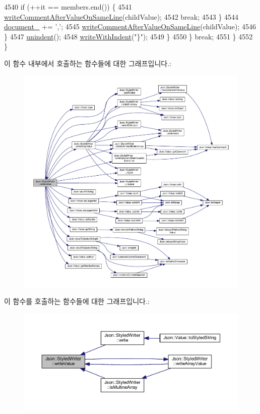 \begin{DoxyCode}
4540         \textcolor{keywordflow}{if} (++it == members.end()) \{
4541           \hyperlink{class_json_1_1_styled_writer_ab12b274c62822fc51ec4617c6be95139}{writeCommentAfterValueOnSameLine}(childValue);
4542           \textcolor{keywordflow}{break};
4543         \}
4544         \hyperlink{class_json_1_1_styled_writer_ae967b0c77e4d7cb889ce7b6ee4ce28d7}{document\_} += \textcolor{charliteral}{','};
4545         \hyperlink{class_json_1_1_styled_writer_ab12b274c62822fc51ec4617c6be95139}{writeCommentAfterValueOnSameLine}(childValue);
4546       \}
4547       \hyperlink{class_json_1_1_styled_writer_acee1c9285519b573cfcb00b7e7f5a809}{unindent}();
4548       \hyperlink{class_json_1_1_styled_writer_ac38e02972054125c38efbe327b52f6ac}{writeWithIndent}(\textcolor{stringliteral}{"\}"});
4549     \}
4550   \} \textcolor{keywordflow}{break};
4551   \}
4552 \}
\end{DoxyCode}
이 함수 내부에서 호출하는 함수들에 대한 그래프입니다.\+:
\nopagebreak
\begin{figure}[H]
\begin{center}
\leavevmode
\includegraphics[width=350pt]{class_json_1_1_styled_writer_ac40143cf43f7c4a94d3d0b41e5245069_cgraph}
\end{center}
\end{figure}
이 함수를 호출하는 함수들에 대한 그래프입니다.\+:\nopagebreak
\begin{figure}[H]
\begin{center}
\leavevmode
\includegraphics[width=350pt]{class_json_1_1_styled_writer_ac40143cf43f7c4a94d3d0b41e5245069_icgraph}
\end{center}
\end{figure}
